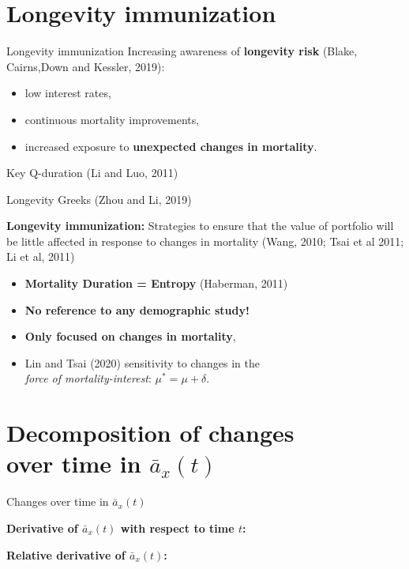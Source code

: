\documentclass[10pt]{beamer}
\begin{document}
\section{Longevity immunization}

\begin{frame}{Longevity immunization}
Increasing awareness of \textbf{longevity risk} {\scriptsize(Blake, Cairns,Down and Kessler, 2019)}:\pause

\begin{itemize}
	\item low interest rates, \pause
	\item continuous mortality improvements, \pause
	\item increased exposure to \textbf{unexpected changes in mortality}. \pause
\end{itemize}


Key Q-duration {\scriptsize(Li and Luo, 2011)} \pause

Longevity Greeks {\scriptsize(Zhou and Li, 2019)} \pause



\textbf{Longevity immunization:} Strategies to ensure that the value of portfolio will be little affected in response to changes in mortality {\scriptsize (Wang, 2010; Tsai et al 2011; Li et al, 2011)}\pause
	
	\begin{itemize}
		\item \textbf{Mortality Duration = Entropy} {\scriptsize(Haberman, 2011)} \pause
		\item \textbf{No reference to any demographic study! } \pause
		\item \textbf{Only focused on changes in mortality}, \pause
		\item Lin and Tsai (2020) sensitivity to changes in the \\ \textit{force of mortality-interest}: $\mu^{*}=\mu+\delta$.
	\end{itemize}
	
\end{frame}


\section{Decomposition of changes \\ over time in $\bar{a}_x(t)$}


\begin{frame}{Changes over time in $\bar{a}_x(t)$}

\textbf{Derivative of $\bar{a}_x(t)$ with respect to time $t$:}

\begin{center}
	\pause
\end{center}

\textbf{Relative derivative of $\bar{a}_x(t)$:}

\begin{center}
\end{center}

\end{frame}
\end{document}

